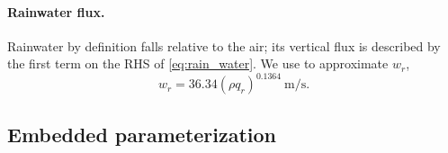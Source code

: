 \paragraph{Rainwater flux.} Rainwater by definition falls relative to the air; its vertical flux is described by the first term on the RHS of \eqref{eq:rain_water}.
  We use \cite[eqns.~(14),(15)]{SoongOgura1973} to approximate $w_r$,
  \begin{equation}
    w_r = 36.34 (\rho q_r)^{0.1364} ~\text{m/s}.
  \end{equation}
  

\subsection{Embedded parameterization}
